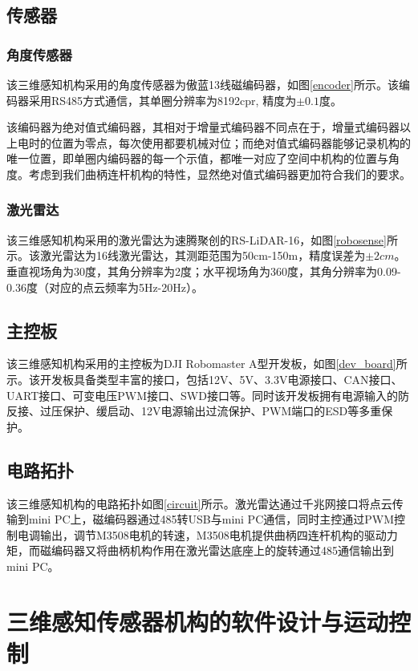 \subsection{传感器}

\subsubsection{角度传感器}
该三维感知机构采用的角度传感器为傲蓝13线磁编码器，如图\ref{encoder}所示。该编码器采用RS485方式通信，其单圈分辨率为8192cpr, 精度为$\pm 0.1$度。

该编码器为绝对值式编码器，其相对于增量式编码器不同点在于，增量式编码器以上电时的位置为零点，每次使用都要机械对位；而绝对值式编码器能够记录机构的唯一位置，即单圈内编码器的每一个示值，都唯一对应了空间中机构的位置与角度。考虑到我们曲柄连杆机构的特性，显然绝对值式编码器更加符合我们的要求。

\subsubsection{激光雷达}
该三维感知机构采用的激光雷达为速腾聚创的RS-LiDAR-16，如图\ref{robosense}所示。该激光雷达为16线激光雷达，其测距范围为50cm-150m，精度误差为$\pm 2cm$。垂直视场角为30度，其角分辨率为2度；水平视场角为360度，其角分辨率为0.09-0.36度（对应的点云频率为5Hz-20Hz）。

\subsection{主控板}
该三维感知机构采用的主控板为DJI Robomaster A型开发板，如图\ref{dev_board}所示。该开发板具备类型丰富的接口，包括12V、5V、3.3V电源接口、CAN接口、UART接口、可变电压PWM接口、SWD接口等。同时该开发板拥有电源输入的防反接、过压保护、缓启动、12V电源输出过流保护、PWM端口的ESD等多重保护。

\subsection{电路拓扑}
该三维感知机构的电路拓扑如图\ref{circuit}所示。激光雷达通过千兆网接口将点云传输到mini PC上，磁编码器通过485转USB与mini PC通信，同时主控通过PWM控制电调输出，调节M3508电机的转速，M3508电机提供曲柄四连杆机构的驱动力矩，而磁编码器又将曲柄机构作用在激光雷达底座上的旋转通过485通信输出到mini PC。

\section{三维感知传感器机构的软件设计与运动控制}

